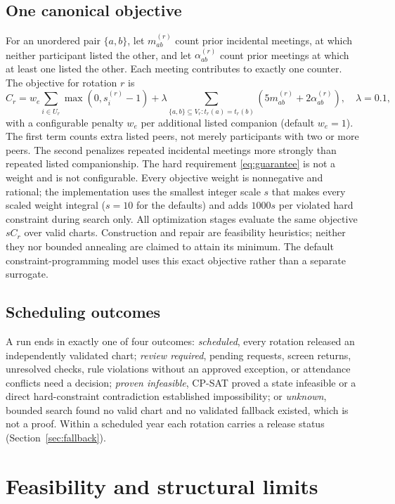 \documentclass[11pt,a4paper]{article}
\theoremstyle{definition}\newtheorem{definition}[theorem]{Definition}
\theoremstyle{remark}\newtheorem{remark}[theorem]{Remark}
\begin{document}
\subsection{One canonical objective}
For an unordered pair $\{a,b\}$, let $m_{ab}^{(r)}$ count prior incidental meetings, at which neither participant listed the other, and let $\alpha_{ab}^{(r)}$ count prior meetings at which at least one listed the other. Each meeting contributes to exactly one counter. The objective for rotation $r$ is
\begin{equation}\label{eq:cost}
 C_r=w_e\sum_{i\in U_r}\max(0,s_i^{(r)}-1)
 +\lambda\sum_{\{a,b\}\subseteq V_r:t_r(a)=t_r(b)}\left(5m_{ab}^{(r)}+2\alpha_{ab}^{(r)}\right),\quad\lambda=0.1,
\end{equation}
with a configurable penalty $w_e$ per additional listed companion (default $w_e=1$). The first term counts extra listed peers, not merely participants with two or more peers. The second penalizes repeated incidental meetings more strongly than repeated listed companionship. The hard requirement \eqref{eq:guarantee} is not a weight and is not configurable. Every objective weight is nonnegative and rational; the implementation uses the smallest integer scale $s$ that makes every scaled weight integral ($s=10$ for the defaults) and adds $1000s$ per violated hard constraint during search only. All optimization stages evaluate the same objective $sC_r$ over valid charts. Construction and repair are feasibility heuristics; neither they nor bounded annealing are claimed to attain its minimum. The default constraint-programming model uses this exact objective rather than a separate surrogate.

\subsection{Scheduling outcomes}
A run ends in exactly one of four outcomes: \emph{scheduled}, every rotation released an independently validated chart; \emph{review required}, pending requests, screen returns, unresolved checks, rule violations without an approved exception, or attendance conflicts need a decision; \emph{proven infeasible}, CP-SAT proved a state infeasible or a direct hard-constraint contradiction established impossibility; or \emph{unknown}, bounded search found no valid chart and no validated fallback existed, which is not a proof. Within a scheduled year each rotation carries a release status (Section~\ref{sec:fallback}).

\section{Feasibility and structural limits}
\end{document}
